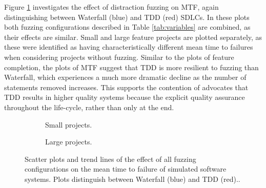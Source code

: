 \documentclass{llncs}
\begin{document}
Figure \ref{fig:fuzzing-mtf} investigates the effect of distraction fuzzing on MTF, again distinguishing between
Waterfall (blue) and TDD (red) SDLCs.  In these plots both fuzzing configurations described in Table \ref{tab:variables}
are combined, as their effects are similar.  Small and large feature projects are plotted separately, as these were
identified as having characteristically different mean time to failures when considering projects without fuzzing.
Similar to the plots of feature completion, the plots of MTF suggest that TDD is more resilient to fuzzing than
Waterfall, which experiences a much more dramatic decline as the number of statements removed increases.  This supports
the contention of advocates that TDD results in higher quality systems because the explicit quality assurance throughout
the life-cycle, rather than only at the end.


\begin{figure}
  \centering
  \begin{subfigure}{2.3in}
    \caption{Small projects.}
  \end{subfigure}
  \hfill
  \begin{subfigure}{2.3in}
    \caption{Large projects.}  
  \end{subfigure}
  
  \caption{Scatter plots and trend lines of the effect of all fuzzing configurations on the mean time to failure of
    simulated software systems.  Plots distinguish between Waterfall (blue) and TDD (red)..}
  \label{fig:fuzzing-mtf}
\end{figure}
 
\end{document}
